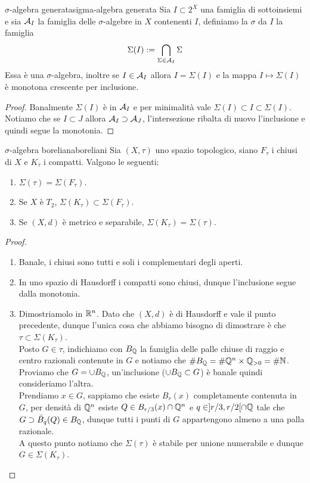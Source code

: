 \begin{proposition}{$\sigma$-algebra generata}{sigma-algebra generata}
    Sia $I \subset 2^X$ una famiglia di sottoinsiemi e sia $\mathcal{A}_I$ la famiglia delle $\sigma$-algebre in $X$ contenenti $I$, definiamo la $\sigma$ da $I$ la famiglia
    \[\Sigma(I) := \bigcap_{\Sigma \in \mathcal{A}_I} \Sigma \]
    Essa è una $\sigma$-algebra, inoltre se $I \in \mathcal{A}_I$ allora $I = \Sigma(I)$ e la mappa $I \mapsto \Sigma(I)$ è monotona crescente per inclusione.
    \begin{proof}
        Banalmente $\Sigma(I)$ è in $\mathcal{A}_I$ e per minimalità vale $\Sigma(I)\subset I \subset \Sigma(I)$.\\
        Notiamo che se $I \subset J$ allora $\mathcal{A}_I \supset \mathcal{A}_J$, l'intersezione ribalta di nuovo l'inclusione e quindi segue la monotonia.
    \end{proof}
\end{proposition}

\begin{proposition}{$\sigma$-algebra boreliana}{boreliani}
    Sia $(X,\tau)$ uno spazio topologico, siano $F_\tau$ i chiusi di $X$ e $K_\tau$ i compatti. Valgono le seguenti: \begin{enumerate}
        \item $\Sigma(\tau) = \Sigma(F_\tau)$.
        \item Se $X$ è $T_2$, $\Sigma(K_\tau) \subset \Sigma(F_\tau)$.
        \item Se $(X,d)$ è metrico e separabile, $\Sigma(K_\tau) = \Sigma(\tau)$.
    \end{enumerate}
    \begin{proof}
        \begin{enumerate}
            \item Banale, i chiusi sono tutti e soli i complementari degli aperti.
            \item In uno spazio di Hausdorff i compatti sono chiusi, dunque l'inclusione segue dalla monotonia.
            \item Dimostriamolo in $\mathbb{R}^n$. Dato che $(X,d)$ è di Hausdorff e vale il punto precedente,  dunque l'unica cosa che abbiamo bisogno di dimostrare è che $\tau \subset \Sigma(K_\tau)$.\\
            Posto $G \in \tau$, indichiamo con $B_{\mathbb{Q}}$ la famiglia delle palle chiuse di raggio e centro razionali contenute in $G$ e notiamo che $\#B_{\mathbb{Q}} = \# \mathbb{Q}^n\times \mathbb{Q}_{>0} = \# \mathbb{N}$. Proviamo che $G = \cup B_{\mathbb{Q}}$, un'inclusione ($\cup B_{\mathbb{Q}}\subset G$) è banale quindi consideriamo l'altra.\\
            Prendiamo $x \in G$, sappiamo che esiste $B_r(x)$ completamente contenuta in $G$, per densità di $\mathbb{Q}^n$ esiste $Q \in B_{r/3}(x) \cap \mathbb{Q}^n$ e $q \in ]r/3, r/2[\cap \mathbb{Q}$ tale che $G \supset \bar{B}_q(Q) \in B_{\mathbb{Q}}$, dunque tutti i punti di $G$ appartengono almeno a una palla razionale.\\
            A questo punto notiamo che $\Sigma(\tau)$ è stabile per unione numerabile e dunque $G \in \Sigma(K_\tau)$.
        \end{enumerate}
\end{proof}
\end{proposition}

